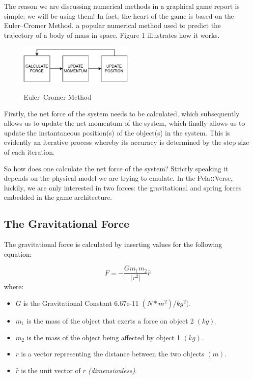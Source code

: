 \documentclass[11pt]{article}
\newcommand{\pelahverse}{Pela\hspace*{1pt}\textbf{::}Verse}
\begin{document}
The reason we are discussing numerical methods in a graphical game report is simple: we will be using them! In fact, the heart of the game is based on the Euler--Cromer Method, a popular numerical method used to predict the trajectory of a body of mass in space. Figure 1 illustrates how it works. 

\begin{figure}[ht]
    \centering
    \includegraphics[width=0.5\textwidth]{Euler_Cromer.pdf}\\
    \caption{Euler--Cromer Method}
    \label{fig:Euler_Cromer}
\end{figure}

Firstly, the net force of the system needs to be calculated, which subsequently allows us to update the net momentum of the system, which finally allows us to update the instantaneous position(s) of the object(s) in the system. This is evidently an iterative process whereby its accuracy is determined by the step size of each iteration.

So how does one calculate the net force of the system? Strictly speaking it depends on the physical model we are trying to emulate. In the \pelahverse{}, luckily, we are only interested in two forces: the gravitational and spring forces embedded in the game architecture.

\subsection{The Gravitational Force}

The gravitational force is calculated by inserting values for the following equation:

\begin{equation}
    F = -\frac{G m_1 m_2}{\vert r ^ 2\vert } \hat{r}
\end{equation}	where: 

\begin{itemize}
    \item $G$ is the Gravitational Constant 6.67e-11 $(N * m^2) / kg^2)$.
    \item $m_1$ is the mass of the object that exerts a force on object 2 $(kg)$.
    \item $m_2$ is the mass of the object being affected by object 1 $(kg)$.
    \item $r$ is a vector representing the distance between the two objects $(m)$.
    \item $\hat{r}$ is the unit vector of $r$ \textit{(dimensionless)}.
\end{itemize}
\end{document}
